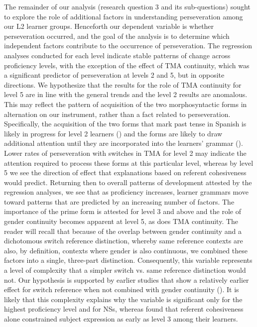 \documentclass[output=paper]{langscibook}
\begin{document}
\begin{sloppypar}
The remainder of our analysis (research question 3 and its sub-questions) sought to explore the role of additional factors in understanding perseveration among our L2 learner groups. Henceforth our dependent variable is whether perseveration occurred, and the goal of the analysis is to determine which independent factors contribute to the occurrence of perseveration. The regression analyses conducted for each level indicate stable patterns of change across proficiency levels, with the exception of the effect of TMA continuity, which was a significant predictor of perseveration at levels 2 and 5, but in opposite directions. We hypothesize that the results for the role of TMA continuity for level 5 are in line with the general trends and the level 2 results are anomalous. This may reflect the pattern of acquisition of the two morphosyntactic forms in alternation on our instrument, rather than a fact related to perseveration. Specifically, the acquisition of the two forms that mark past tense in Spanish is likely in progress for level 2 learners (\citealt{Salaberry2011}) and the forms are likely to draw additional attention until they are incorporated into the learners’ grammar (\citealt{VanPatten1990}). Lower rates of perseveration with switches in TMA for level 2 may indicate the attention required to process these forms at this particular level, whereas by level 5 we see the direction of effect that explanations based on referent cohesiveness would predict. Returning then to overall patterns of development attested by the regression analyses, we see that as proficiency increases, learner grammars move toward patterns that are predicted by an increasing number of factors. The importance of the prime form is attested for level 3 and above and the role of gender continuity becomes apparent at level 5, as does TMA continuity. The reader will recall that because of the overlap between gender continuity and a dichotomous switch reference distinction, whereby same reference contexts are also, by definition, contexts where gender is also continuous, we combined these factors into a single, three-part distinction. Consequently, this variable represents a level of complexity that a simpler switch vs. same reference distinction would not. Our hypothesis is supported by earlier studies that show a relatively earlier effect for switch reference when not combined with gender continuity (\citealt{GeeslinLinfordFafulas2015}). It is likely that this complexity explains why the variable is significant only for the highest proficiency level and for NSs, whereas \citet{LinfordGeeslinForthcoming} found that referent cohesiveness alone constrained subject expression as early as level 3 among their learners.
\end{sloppypar}
\end{document}
